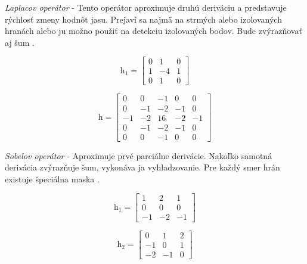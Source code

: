 \textit{Laplacov operátor} - Tento operátor aproximuje druhú deriváciu a predstavuje rýchlosť zmeny hodnôt jasu. Prejaví sa najmä na strmých alebo izolovaných hranách alebo ju možno použiť na detekciu izolovaných bodov. Bude zvýrazňovať aj šum \cite{Detekcia_a_rozpoznavanie_objektov}.

\begin{figure}[H]
    \centering
    \begin{minipage}[b]{0.49\textwidth}
        $$\textit{h}_1=\begin{bmatrix} 0 & 1 & 0 \\ 1 & -4 & 1 \\ 0 & 1 & 0  \end{bmatrix}$$
    \end{minipage}
    \hfill
    \begin{minipage}[b]{0.49\textwidth}
        $$\textit{h}=\begin{bmatrix} 0 & 0 & -1 & 0 & 0 \\ 0 & -1 & -2 & -1 & 0 \\ -1 & -2 & 16 & -2 & -1 \\ 0 & -1 & -2 & -1 & 0 \\ 0 & 0 & -1 & 0 & 0  \end{bmatrix}$$
    \end{minipage}
\end{figure}


\textit{Sobelov operátor} - Aproximuje prvé parciálne derivácie. Nakoľko samotná derivácia zvýrazňuje šum, vykonáva ja vyhladzovanie. Pre každý smer hrán existuje špeciálna maska \cite{Detekcia_a_rozpoznavanie_objektov}.

\begin{figure}[H]
    \centering
    \begin{minipage}[b]{0.49\textwidth}
        $$\textit{h}_1=\begin{bmatrix} 1 & 2 & 1 \\ 0 & 0 & 0 \\ -1 & -2 & -1  \end{bmatrix}$$
    \end{minipage}
    \hfill
    \begin{minipage}[b]{0.49\textwidth}
        $$\textit{h}_2=\begin{bmatrix} 0 & 1 & 2 \\ -1 & 0 & 1 \\ -2 & -1 & 0  \end{bmatrix}$$
    \end{minipage}
\end{figure}


